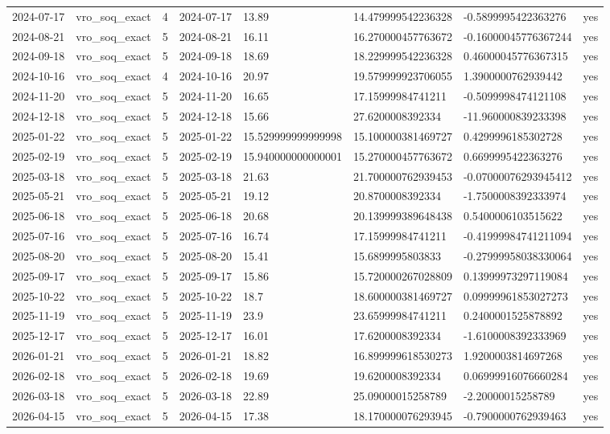 \begin{tabular}{llllllll}
2024-07-17 & vro\_soq\_exact & 4 & 2024-07-17 & 13.89 & 14.479999542236328 & -0.5899995422363276 & yes \\
2024-08-21 & vro\_soq\_exact & 5 & 2024-08-21 & 16.11 & 16.270000457763672 & -0.16000045776367244 & yes \\
2024-09-18 & vro\_soq\_exact & 5 & 2024-09-18 & 18.69 & 18.229999542236328 & 0.46000045776367315 & yes \\
2024-10-16 & vro\_soq\_exact & 4 & 2024-10-16 & 20.97 & 19.579999923706055 & 1.3900000762939442 & yes \\
2024-11-20 & vro\_soq\_exact & 5 & 2024-11-20 & 16.65 & 17.15999984741211 & -0.5099998474121108 & yes \\
2024-12-18 & vro\_soq\_exact & 5 & 2024-12-18 & 15.66 & 27.6200008392334 & -11.960000839233398 & yes \\
2025-01-22 & vro\_soq\_exact & 5 & 2025-01-22 & 15.529999999999998 & 15.100000381469727 & 0.4299996185302728 & yes \\
2025-02-19 & vro\_soq\_exact & 5 & 2025-02-19 & 15.940000000000001 & 15.270000457763672 & 0.6699995422363276 & yes \\
2025-03-18 & vro\_soq\_exact & 5 & 2025-03-18 & 21.63 & 21.700000762939453 & -0.07000076293945412 & yes \\
2025-05-21 & vro\_soq\_exact & 5 & 2025-05-21 & 19.12 & 20.8700008392334 & -1.7500008392333974 & yes \\
2025-06-18 & vro\_soq\_exact & 5 & 2025-06-18 & 20.68 & 20.139999389648438 & 0.5400006103515622 & yes \\
2025-07-16 & vro\_soq\_exact & 5 & 2025-07-16 & 16.74 & 17.15999984741211 & -0.41999984741211094 & yes \\
2025-08-20 & vro\_soq\_exact & 5 & 2025-08-20 & 15.41 & 15.6899995803833 & -0.27999958038330064 & yes \\
2025-09-17 & vro\_soq\_exact & 5 & 2025-09-17 & 15.86 & 15.720000267028809 & 0.13999973297119084 & yes \\
2025-10-22 & vro\_soq\_exact & 5 & 2025-10-22 & 18.7 & 18.600000381469727 & 0.09999961853027273 & yes \\
2025-11-19 & vro\_soq\_exact & 5 & 2025-11-19 & 23.9 & 23.65999984741211 & 0.2400001525878892 & yes \\
2025-12-17 & vro\_soq\_exact & 5 & 2025-12-17 & 16.01 & 17.6200008392334 & -1.6100008392333969 & yes \\
2026-01-21 & vro\_soq\_exact & 5 & 2026-01-21 & 18.82 & 16.899999618530273 & 1.9200003814697268 & yes \\
2026-02-18 & vro\_soq\_exact & 5 & 2026-02-18 & 19.69 & 19.6200008392334 & 0.06999916076660284 & yes \\
2026-03-18 & vro\_soq\_exact & 5 & 2026-03-18 & 22.89 & 25.09000015258789 & -2.20000015258789 & yes \\
2026-04-15 & vro\_soq\_exact & 5 & 2026-04-15 & 17.38 & 18.170000076293945 & -0.7900000762939463 & yes \\
\bottomrule
\end{tabular}
